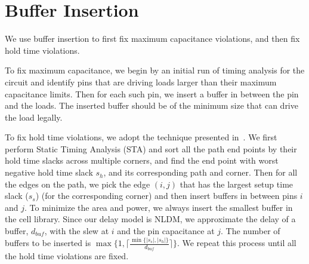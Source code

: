 \section{Buffer Insertion}
We use buffer insertion to first fix maximum capacitance violations, and then fix hold time violations.

To fix maximum capacitance, we begin by an initial run of timing analysis for the circuit and identify pins that are driving loads larger than their maximum capacitance limits. Then for each such pin, we insert a buffer in between the pin and the loads. The inserted buffer should be of the minimum size that can drive the load legally.

To fix hold time violations, we adopt the technique presented in~\cite{Shenoy:Minimum}. We first perform Static Timing Analysis (STA) and sort all the path end points by their hold time slacks across multiple corners, and find the end point with worst negative hold time slack $s_h$, and its corresponding path and corner. Then for all the edges on the path, we pick the edge $(i, j)$ that has the largest setup time slack ($s_s$) (for the corresponding corner) and then insert buffers in between pins $i$ and $j$. To minimize the area and power, we always insert the smallest buffer in the cell library. Since our delay model is NLDM, we approximate the delay of a buffer, $d_{buf}$, with the slew at $i$ and the pin capacitance at $j$. The number of buffers to be inserted is $\max\{1, \lceil\frac{\min\{|s_s|, |s_h|\}}{d_{buf}}\rceil\}$. We repeat this process until all the hold time violations are fixed.






